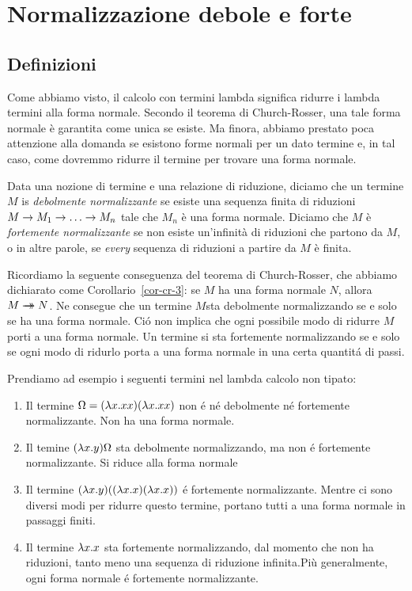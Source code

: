 \documentclass{article}
\begin{document}
\section{Normalizzazione debole e forte}

\subsection{Definizioni}

Come abbiamo visto, il calcolo con termini lambda significa ridurre i lambda
termini alla forma normale. Secondo il teorema di Church-Rosser, una tale 
forma normale \`e garantita come unica se esiste. Ma finora, abbiamo prestato poca
attenzione alla domanda se esistono forme normali per un dato termine e, in tal caso,
come dovremmo ridurre il termine per trovare una forma normale.

\begin{definition}
	Data una nozione di termine e una relazione di riduzione, diciamo che un termine 
	$M$ is {\em debolmente normalizzante} se esiste una sequenza finita di riduzioni
	$M\rightarrow M_1\rightarrow\ldots\rightarrow M_n$ tale che $M_n$ \`e una forma normale.
	Diciamo che $M$ \`e {\em fortemente normalizzante} se non esiste un'infinit\`a
	di riduzioni che partono da $M$, o in altre parole, se {\em every} sequenza di riduzioni a partire da
	$M$ \`e finita. 
\end{definition}

Ricordiamo la seguente conseguenza del teorema di Church-Rosser, che 
abbiamo dichiarato come Corollario~\ref{cor-cr-3}: se $M$ ha una forma normale $N$,
allora $M\mathrel{\rightarrow\!\!\!\!\!\rightarrow} N$. Ne consegue che un termine $M$sta debolmente normalizzando
se e solo se ha una forma normale. Ci\'o non implica che ogni possibile modo di 
ridurre $M$ porti a una forma normale. Un termine si sta fortemente normalizzando
se e solo se ogni modo di ridurlo porta a una forma normale in una certa quantit\'a di passi.

Prendiamo ad esempio i seguenti termini nel lambda calcolo non tipato:
\begin{enumerate}
	\item Il termine $\Omega=(\lambda x.xx)(\lambda x.xx)$ non \'e n\'e debolmente n\'e
	fortemente normalizzante. Non ha una forma normale.
	\item Il temine $(\lambda x.y)\Omega$ sta debolmente normalizzando, ma non \'e
	fortemente normalizzante. Si riduce alla forma normale
	\item Il termine $(\lambda x.y)((\lambda x.x)(\lambda x.x))$ \'e fortemente
	normalizzante. Mentre ci sono diversi modi per ridurre questo
	termine, portano tutti a una forma normale in passaggi finiti.
	\item Il termine $\lambda x.x$ sta fortemente normalizzando, dal momento che non ha
	riduzioni, tanto meno una sequenza di riduzione infinita.Pi\`u
	generalmente, ogni forma normale \'e fortemente normalizzante.
\end{enumerate}
\end{document}
